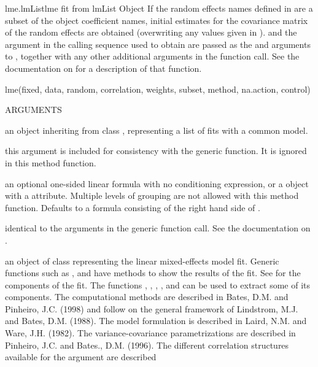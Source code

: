 \documentclass[pdftex]{article} \usepackage{url,graphicx}
\begin{document}
\begin{Helpfile}{lme.lmList}{{\sc lme} fit from lmList Object}
If the random effects names defined in  are a subset of
the  object coefficient names, initial estimates for the
covariance matrix of the random effects are obtained (overwriting any
values given in ).  and the
 argument in the calling sequence used to obtain
 are passed as the  and  arguments
to , together with any other additional arguments in
the function call. See the documentation on  for a
description of that function.
\begin{Example}
lme(fixed, data, random, correlation, weights, subset, method,
    na.action, control)
\end{Example}
\begin{Argument}{ARGUMENTS}
\item[\Co{fixed:}]
an object inheriting from class ,
representing a list of  fits with a common model.
\item[\Co{data:}]
this argument is included for consistency with the generic
function. It is ignored in this method function.
\item[\Co{random:}]
an optional one-sided linear formula with no conditioning
expression, or a  object with a 
attribute. Multiple levels of grouping are not allowed with this
method function.  Defaults to a formula consisting of the right hand
side of .
\item[\Co{other arguments:}]
identical to the arguments in the generic
function call. See the documentation on .
\end{Argument}
an object of class  representing the linear mixed-effects
model fit. Generic functions such as ,  and
 have methods to show the results of the fit. See
 for the components of the fit. The functions
, , , , and
  can be used to extract some of its components.
The computational methods are described in Bates, D.M. and Pinheiro, J.C.
(1998) and follow on the general framework of Lindstrom, M.J. and Bates,
D.M. (1988). The model formulation is described in Laird, N.M. and Ware,
J.H. (1982).  The variance-covariance parametrizations are described in
Pinheiro, J.C. and Bates., D.M.  (1996).   The different correlation
structures available for the  argument are described

\end{Helpfile}
\end{document}
